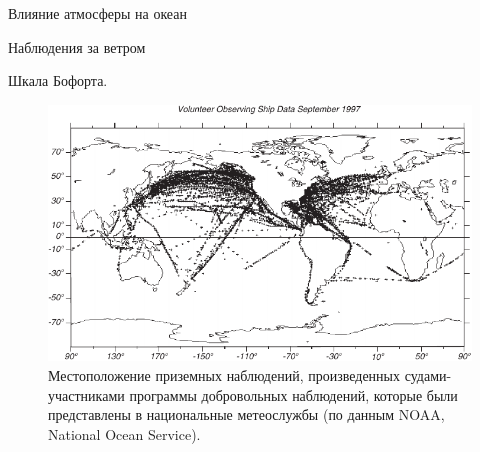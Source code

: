\begin{chapter}{Влияние атмосферы на океан}
\begin{section}{Наблюдения за ветром}
\begin{paragraph}{Шкала Бофорта.}
\begin{figure}[t!]
\begin{centering}
\includegraphics{pics/shiplocations}
\end{centering}
\caption{Местоположение приземных наблюдений, произведенных судами-участниками
программы добровольных наблюдений, которые были представлены в национальные
метеослужбы (по данным NOAA, National Ocean Service).}
\label{fig:shiplocations}
\end{figure}
%
% 
\end{paragraph}


\end{section}
\end{chapter}
